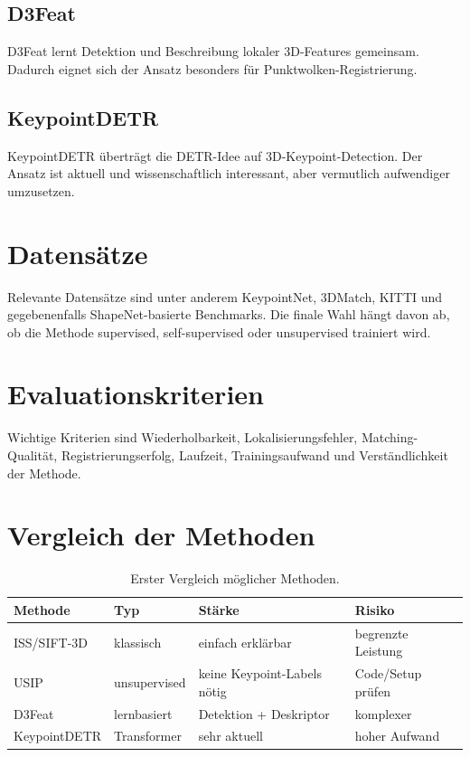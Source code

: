 \documentclass[11pt,a4paper]{article}
\begin{document}
\subsection{D3Feat}
D3Feat lernt Detektion und Beschreibung lokaler 3D-Features gemeinsam. Dadurch eignet sich der Ansatz besonders für Punktwolken-Registrierung.

\subsection{KeypointDETR}
KeypointDETR überträgt die DETR-Idee auf 3D-Keypoint-Detection. Der Ansatz ist aktuell und wissenschaftlich interessant, aber vermutlich aufwendiger umzusetzen.

\section{Datensätze}
Relevante Datensätze sind unter anderem KeypointNet, 3DMatch, KITTI und gegebenenfalls ShapeNet-basierte Benchmarks. Die finale Wahl hängt davon ab, ob die Methode supervised, self-supervised oder unsupervised trainiert wird.

\section{Evaluationskriterien}
Wichtige Kriterien sind Wiederholbarkeit, Lokalisierungsfehler, Matching-Qualität, Registrierungserfolg, Laufzeit, Trainingsaufwand und Verständlichkeit der Methode.

\section{Vergleich der Methoden}
\begin{table}[h]
\centering
\begin{tabular}{llll}
\toprule
Methode & Typ & Stärke & Risiko \\
\midrule
ISS/SIFT-3D & klassisch & einfach erklärbar & begrenzte Leistung \\
USIP & unsupervised & keine Keypoint-Labels nötig & Code/Setup prüfen \\
D3Feat & lernbasiert & Detektion + Deskriptor & komplexer \\
KeypointDETR & Transformer & sehr aktuell & hoher Aufwand \\
\bottomrule
\end{tabular}
\caption{Erster Vergleich möglicher Methoden.}
\end{table}
\end{document}
